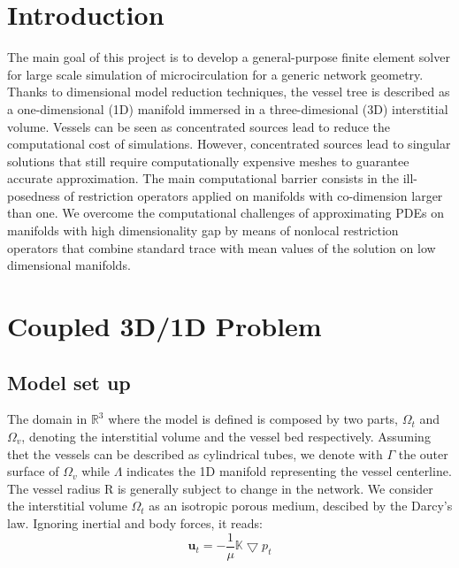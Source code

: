 \documentclass[a4paper]{report}
\begin{document}
\tableofcontents
 
 
\chapter*{Introduction}
\setcounter{page}{1} 
The main goal of this project is to develop a general-purpose finite element solver for large scale simulation of microcirculation for a generic network geometry.\\
Thanks to dimensional model reduction techniques, the vessel tree is described as a one-dimensional (1D) manifold immersed in a three-dimesional (3D) interstitial volume. Vessels can be seen as concentrated sources lead to reduce the computational cost of simulations. However, concentrated sources lead to singular solutions that still require computationally expensive meshes to guarantee accurate approximation. The main computational barrier consists in the ill-posedness of restriction operators applied on manifolds with co-dimension larger than one. We overcome the computational challenges of approximating PDEs on manifolds with high dimensionality gap by means of nonlocal restriction operators that combine standard trace with mean values of the solution on low dimensional manifolds.\\



\newpage
\chapter{Coupled 3D/1D Problem}
	\section{Model set up}
	The domain in $\mathbb{R}^{3} $ where the model is defined is composed by two parts, $\Omega_{t}$ and $\Omega_{v}$, denoting the interstitial volume and the vessel bed respectively. Assuming thet the vessels can be described as cylindrical tubes, we denote with $    	\Gamma$ the outer surface of $\Omega_{v}$ while $\Lambda$ indicates the 1D manifold representing the vessel centerline. The vessel radius R is generally subject to change in the network.\newline
	We consider the interstitial volume $\Omega_{t}$ as an isotropic porous medium, descibed by the Darcy's law. Ignoring inertial and body forces, it reads:
\begin{equation}
\mathbf{u}_{t} =  -\frac{1}{\mu}\mathbf{\mathbb{K}}\bigtriangledown p_{t} 
\end{equation}
\end{document}
